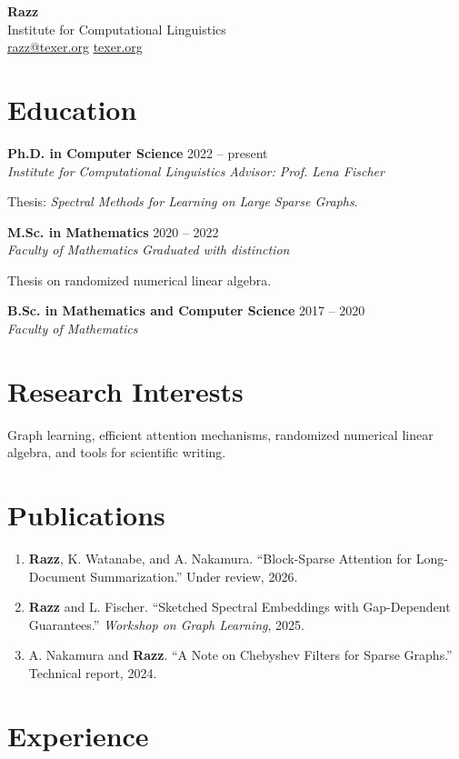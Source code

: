 \documentclass[11pt,a4paper]{article}
\newcommand{\entry}[4]{\textbf{#1} \hfill #2 \\ \textit{#3} \hfill \textit{#4} \par\vspace{2pt}}
\begin{document}
\begin{center}
  {\LARGE \textbf{Razz}} \\[4pt]
  Institute for Computational Linguistics \\
  \href{mailto:razz@texer.org}{razz@texer.org} \quad \textbullet \quad \href{https://texer.org}{texer.org}
\end{center}

\section{Education}

\entry{Ph.D. in Computer Science}{2022 -- present}{Institute for Computational Linguistics}{Advisor: Prof. Lena Fischer}
Thesis: \emph{Spectral Methods for Learning on Large Sparse Graphs}.

\vspace{4pt}
\entry{M.Sc. in Mathematics}{2020 -- 2022}{Faculty of Mathematics}{Graduated with distinction}
Thesis on randomized numerical linear algebra.

\vspace{4pt}
\entry{B.Sc. in Mathematics and Computer Science}{2017 -- 2020}{Faculty of Mathematics}{}

\section{Research Interests}

Graph learning, efficient attention mechanisms, randomized numerical linear algebra, and tools for scientific writing.

\section{Publications}

\begin{enumerate}[leftmargin=1.5em, itemsep=2pt]
  \item \textbf{Razz}, K. Watanabe, and A. Nakamura. ``Block-Sparse Attention for Long-Document Summarization.'' Under review, 2026.
  \item \textbf{Razz} and L. Fischer. ``Sketched Spectral Embeddings with Gap-Dependent Guarantees.'' \emph{Workshop on Graph Learning}, 2025.
  \item A. Nakamura and \textbf{Razz}. ``A Note on Chebyshev Filters for Sparse Graphs.'' Technical report, 2024.
\end{enumerate}

\section{Experience}
\end{document}
